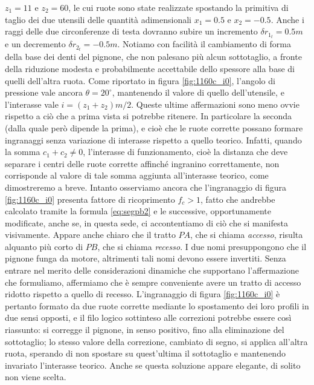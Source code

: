 $z_1=11$ e $z_2=60$, le cui ruote sono state realizzate spostando la
primitiva di taglio dei due 
utensili delle quantit\`a adimensionali $x_1=0.5$ e $x_2=-0.5$. Anche i raggi
delle due circonferenze di testa dovranno subire
un incremento $\delta r_{1_t}=0.5 m$
e un decremento  $\delta r_{2_t}=-0.5 m$. 
Notiamo con facilit\`a il cambiamento di forma della base dei denti del 
pignone, che non palesano pi\`u alcun sottotaglio, a fronte della riduzione
modesta e
probabilmente accettabile dello spessore alla base di quelli dell'altra ruota.
Come riportato in figura \ref{fig:1160c_i0},
l'angolo di pressione vale ancora $\theta=20^{\circ}$, mantenendo 
il valore di quello dell'utensile, e l'interasse vale $i=(z_1+z_2)m/2$.
Queste ultime affermazioni sono meno ovvie
rispetto a ci\`o che a prima vista si potrebbe ritenere. In particolare
la seconda (dalla quale per\`o dipende la prima), e cio\`e che le ruote
corrette possano formare ingranaggi senza variazione di interasse rispetto
a quello teorico.
Infatti, quando la somma $c_1+c_2 \ne 0$, l'interasse di funzionamento,
cio\`e la distanza che deve separare i centri delle ruote corrette affinch\'e
ingranino correttamente, non corrisponde al valore di tale somma aggiunta
all'interasse teorico, come dimostreremo a breve. 
Intanto osserviamo ancora che l'ingranaggio di figura \ref{fig:1160c_i0} presenta
fattore di ricoprimento $f_c > 1$, fatto che andrebbe calcolato tramite
la formula \ref{eq:segpb2} e le successive, opportunamente modificate, anche se,
in questa sede, ci accontentiamo di ci\`o che si manifesta visivamente. Appare
anche chiaro che il tratto $PA$, che si chiama {\em accesso},
risulta alquanto pi\`u corto di $PB$, che si chiama {\em recesso}.
I due nomi
presuppongono che il pignone funga da motore, altrimenti tali nomi devono essere
invertiti. Senza entrare nel merito delle considerazioni dinamiche che
supportano l'affermazione che formuliamo, affermiamo che \`e sempre conveniente
avere un tratto di accesso ridotto rispetto a quello di recesso.
L'ingranaggio di figura \ref{fig:1160c_i0} \`e pertanto formato da due ruote
corrette mediante lo spostamento dei loro profili in due sensi opposti,
e il filo logico sottinteso alle correzioni
potrebbe essere cos\`i riassunto: si corregge il pignone, in senso positivo, 
fino alla eliminazione del sottotaglio; lo stesso valore della correzione,
cambiato di segno, si applica all'altra ruota, sperando di non spostare su
quest'ultima il sottotaglio e mantenendo invariato l'interasse teorico.
Anche se questa soluzione appare elegante, di solito non viene scelta.
